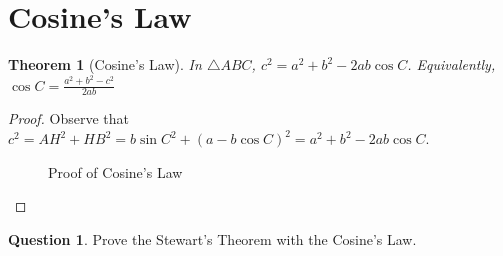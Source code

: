 \documentclass{article}
\newtheorem{theorem}{Theorem}[section]
\theoremstyle{definition}
\newtheorem{question}{Question}
\begin{document}
\section{Cosine's Law}
\begin{mdframed}
	\begin{theorem}[Cosine's Law]
		In $\triangle ABC$,  $c^2 = a^2 + b^2 - 2ab\cos C$. Equivalently, $\cos C = \frac{a^2+b^2-c^2}{2ab}$
	\end{theorem}
\end{mdframed}
\begin{proof}
	Observe that $c^2=AH^2+HB^2=b\sin C^2+(a-b\cos C)^2=a^2+b^2-2ab\cos C$.
	\begin{figure}[H]
		\centering
		\caption{Proof of Cosine's Law}
	\end{figure}
\end{proof}
\begin{question}
	Prove the Stewart's Theorem with the Cosine's Law.
\end{question}
\vspace{5cm}
\end{document}
